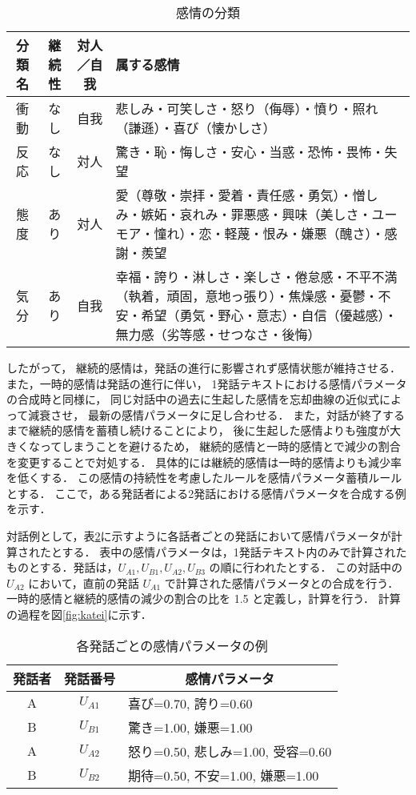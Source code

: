 \documentclass[japanese]{jnlp_1.3c}
\begin{document}
\begin{table}[b]
\begin{center}
\caption{感情の分類}
\begin{tabular}{|c|c|c|p{8cm}|}
\hline
分類名 & 継続性 & 対人／自我 & 属する感情 \\ \hline \hline
衝動 & なし & 自我  & 悲しみ・可笑しさ・怒り（侮辱）・憤り・照れ（謙遜）・喜び（懐かしさ）\\ \hline
反応 & なし & 対人  & 驚き・恥・悔しさ・安心・当惑・恐怖・畏怖・失望 \\ \hline
態度 & あり & 対人  & 愛（尊敬・崇拝・愛着・責任感・勇気）・憎しみ・嫉妬・哀れみ・罪悪感・興味（美しさ・ユーモア・憧れ）・恋・軽蔑・恨み・嫌悪（醜さ）・感謝・羨望  \\ \hline
気分 & あり & 自我  & 幸福・誇り・淋しさ・楽しさ・倦怠感・不平不満（執着，頑固，意地っ張り）・焦燥感・憂鬱・不安・希望（勇気・野心・意志）・自信（優越感）・無力感（劣等感・せつなさ・後悔） \\ \hline
\end{tabular}
\label{tb:emotion_category}
\end{center}
\end{table}

したがって，
継続的感情は，発話の進行に影響されず感情状態が維持させる．
また，一時的感情は発話の進行に伴い，
1発話テキストにおける感情パラメータの合成時と同様に，
同じ対話中の過去に生起した感情を忘却曲線の近似式によって減衰させ，
最新の感情パラメータに足し合わせる．
また，対話が終了するまで継続的感情を蓄積し続けることにより，
後に生起した感情よりも強度が大きくなってしまうことを避けるため，
継続的感情と一時的感情とで減少の割合を変更することで対処する．
具体的には継続的感情は一時的感情よりも減少率を低くする．
この感情の持続性を考慮したルールを感情パラメータ蓄積ルールとする．
ここで，ある発話者による2発話における感情パラメータを合成する例を示す．

対話例として，表\ref{tb:para_ex}に示すように各話者ごとの発話において感情パラメータが計算されたとする．
表中の感情パラメータは，1発話テキスト内のみで計算されたものとする．発話は，$U_{A1}, U_{B1}, U_{A2}, U_{B3}$ の順に行われたとする．
この対話中の$U_{A2}$ において，直前の発話 $U_{A1}$ で計算された感情パラメータとの合成を行う．
一時的感情と継続的感情の減少の割合の比を 1.5 と定義し，計算を行う．
計算の過程を図\ref{fig:katei}に示す．

\begin{table}[b]
\begin{center}
\caption{各発話ごとの感情パラメータの例}
\begin{tabular}{|c|c|l|}
\hline
\multicolumn{1}{|c|}{発話者}	&	発話番号	&	\multicolumn{1}{|c|}{感情パラメータ}	\\ \hline \hline
A	& $U_{A1}$	&	喜び=0.70, 誇り=0.60	\\ \hline
B	& $U_{B1}$ 	&	驚き=1.00, 嫌悪=1.00	\\ \hline 
A	& $U_{A2}$ 	&	怒り=0.50, 悲しみ=1.00, 受容=0.60	\\ \hline
B	& $U_{B2}$ 	&	期待=0.50, 不安=1.00, 嫌悪=1.00		\\ \hline
\end{tabular}
\label{tb:para_ex}
\end{center}
\end{table}
\end{document}

